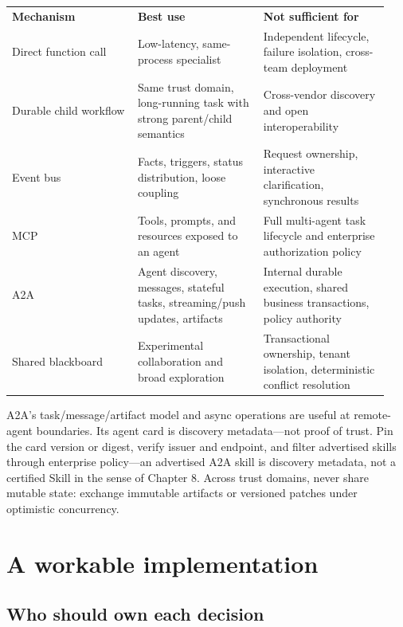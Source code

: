 \BookTableStart
\small
\begin{tabular}{@{}Y{0.3133\linewidth}Y{0.3133\linewidth}Y{0.3133\linewidth}@{}}
\color{white}\bfseries \textbf{Mechanism} & \color{white}\bfseries \textbf{Best use} & \color{white}\bfseries \textbf{Not sufficient for} \\
Direct function call & Low-latency, same-process specialist & Independent lifecycle, failure isolation, cross-team deployment \\
Durable child workflow & Same trust domain, long-running task with strong parent/child semantics & Cross-vendor discovery and open interoperability \\
Event bus & Facts, triggers, status distribution, loose coupling & Request ownership, interactive clarification, synchronous results \\
MCP & Tools, prompts, and resources exposed to an agent & Full multi-agent task lifecycle and enterprise authorization policy \\
A2A & Agent discovery, messages, stateful tasks, streaming/push updates, artifacts & Internal durable execution, shared business transactions, policy authority \\
Shared blackboard & Experimental collaboration and broad exploration & Transactional ownership, tenant isolation, deterministic conflict resolution \\
\end{tabular}
\BookTableEnd

A2A’s task/message/artifact model and async operations are useful at remote-agent boundaries. Its agent card is discovery metadata—not proof of trust. Pin the card version or digest, verify issuer and endpoint, and filter advertised skills through enterprise policy—an advertised A2A skill is discovery metadata, not a certified Skill in the sense of Chapter 8. Across trust domains, never share mutable state: exchange immutable artifacts or versioned patches under optimistic concurrency.\par

\section{A workable implementation}

\subsection{Who should own each decision}

